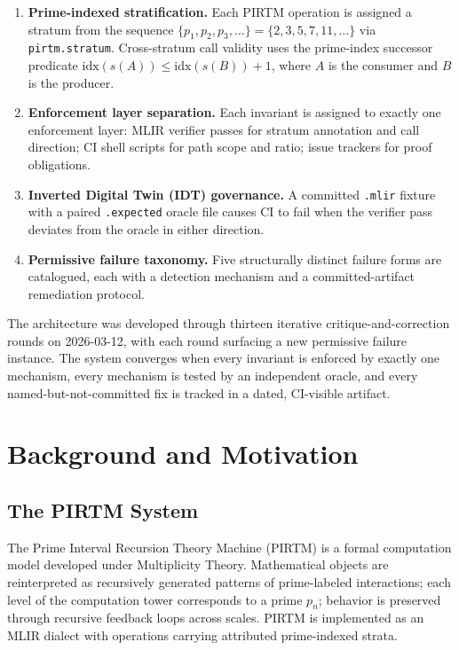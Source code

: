 \documentclass[11pt,letterpaper]{article}
\theoremstyle{pirtmthm}
\theoremstyle{remark}
\begin{document}
\begin{enumerate}[leftmargin=1.8em]
  \item \textbf{Prime-indexed stratification.}
    Each PIRTM operation is assigned a stratum from the sequence
    $\{p_1, p_2, p_3, \ldots\} = \{2, 3, 5, 7, 11, \ldots\}$ via
    \texttt{pirtm.stratum}.
    Cross-stratum call validity uses the prime-index successor predicate
    $\mathrm{idx}(s(A)) \leq \mathrm{idx}(s(B)) + 1$, where $A$ is the
    consumer and $B$ is the producer.

  \item \textbf{Enforcement layer separation.}
    Each invariant is assigned to exactly one enforcement layer: MLIR verifier
    passes for stratum annotation and call direction; CI shell scripts for
    path scope and ratio; issue trackers for proof obligations.

  \item \textbf{Inverted Digital Twin (IDT) governance.}
    A committed \texttt{.mlir} fixture with a paired \texttt{.expected} oracle
    file causes CI to fail when the verifier pass deviates from the oracle in
    either direction.

  \item \textbf{Permissive failure taxonomy.}
    Five structurally distinct failure forms are catalogued, each with a
    detection mechanism and a committed-artifact remediation protocol.
\end{enumerate}

The architecture was developed through thirteen iterative critique-and-correction
rounds on 2026-03-12, with each round surfacing a new permissive failure instance.
The system converges when every invariant is enforced by exactly one mechanism,
every mechanism is tested by an independent oracle, and every named-but-not-committed
fix is tracked in a dated, CI-visible artifact.

\section{Background and Motivation}

\subsection{The PIRTM System}

The Prime Interval Recursion Theory Machine (PIRTM) is a formal computation
model developed under Multiplicity Theory.
Mathematical objects are reinterpreted as recursively generated patterns of
prime-labeled interactions; each level of the computation tower corresponds to
a prime $p_n$; behavior is preserved through recursive feedback loops across scales.
PIRTM is implemented as an MLIR dialect with operations carrying attributed
prime-indexed strata.
\end{document}
